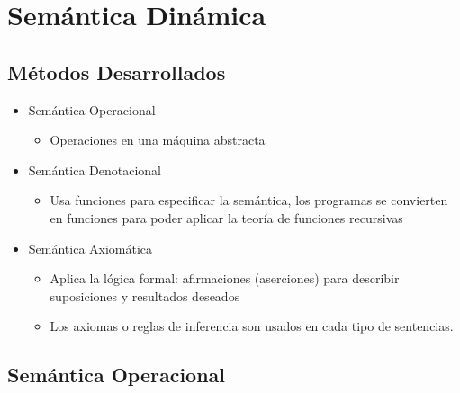 \documentclass[11pt]{article}
\begin{document}
\section*{Semántica Dinámica}
\label{sec:org0df1f6c}

\subsection*{Métodos Desarrollados}
\label{sec:orgcb2c3eb}
\begin{itemize}
\item Semántica Operacional
\begin{itemize}
\item Operaciones en una máquina abstracta
\end{itemize}
\item Semántica Denotacional
\begin{itemize}
\item Usa funciones para especificar la semántica, los programas se
convierten en funciones para poder aplicar la teoría de funciones recursivas
\end{itemize}
\item Semántica Axiomática
\begin{itemize}
\item Aplica la lógica formal: afirmaciones (aserciones) para describir
suposiciones y resultados deseados
\item Los axiomas o reglas de inferencia son usados en cada tipo de
sentencias.
\end{itemize}
\end{itemize}


\subsection*{Semántica Operacional}
\label{sec:org963848d}
\end{document}
